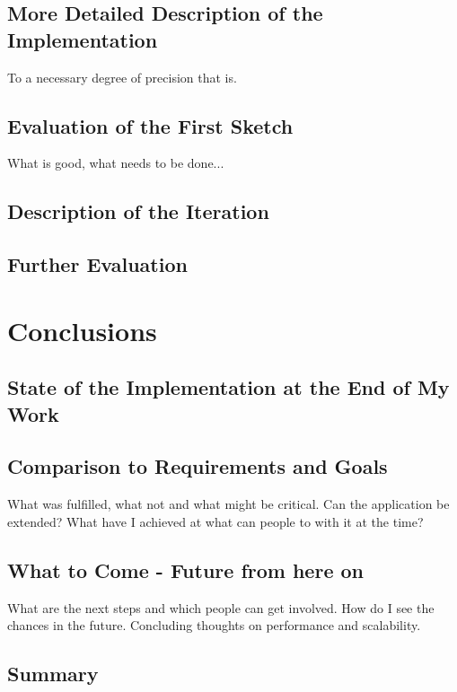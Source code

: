 \documentclass[12p]{scrartcl}
\begin{document}
\subsection{More Detailed Description of the Implementation}
To a necessary degree of precision that is.
\subsection{Evaluation of the First Sketch}
What is good, what needs to be done...
\subsection{Description of the Iteration}
\subsection{Further Evaluation}




\section{Conclusions}
\subsection{State of the Implementation at the End of My Work}
\subsection{Comparison to Requirements and Goals}
What was fulfilled, what not and what might be critical. Can the application be extended? What have I achieved at what can people to with it at the time?
\subsection{What to Come - Future from here on}
What are the next steps and which people can get involved. How do I see the chances in the future. Concluding thoughts on performance and scalability.
\subsection{Summary}
\end{document}

